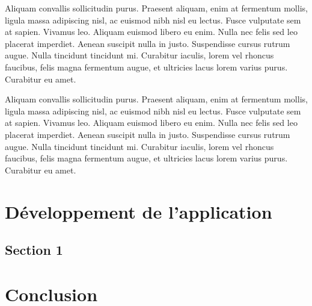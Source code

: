 \documentclass[twoside]{report}
\newcommand{\clearemptydoublepage}{\newpage{\pagestyle{empty}
\cleardoublepage}}
\begin{document}
Aliquam convallis sollicitudin purus. Praesent aliquam, enim at fermentum mollis, ligula massa adipiscing nisl, ac euismod nibh nisl eu lectus. Fusce vulputate sem at sapien. Vivamus leo. Aliquam euismod libero eu enim. Nulla nec felis sed leo placerat imperdiet. Aenean suscipit nulla in justo. Suspendisse cursus rutrum augue. Nulla tincidunt tincidunt mi. Curabitur iaculis, lorem vel rhoncus faucibus, felis magna fermentum augue, et ultricies lacus lorem varius purus. Curabitur eu amet.

Aliquam convallis sollicitudin purus. Praesent aliquam, enim at fermentum mollis, ligula massa adipiscing nisl, ac euismod nibh nisl eu lectus. Fusce vulputate sem at sapien. Vivamus leo. Aliquam euismod libero eu enim. Nulla nec felis sed leo placerat imperdiet. Aenean suscipit nulla in justo. Suspendisse cursus rutrum augue. Nulla tincidunt tincidunt mi. Curabitur iaculis, lorem vel rhoncus faucibus, felis magna fermentum augue, et ultricies lacus lorem varius purus. Curabitur eu amet.

\clearemptydoublepage
\chapter{Développement de l'application}
\section{Section 1}

\clearemptydoublepage
\chapter*{Conclusion}

\clearemptydoublepage
\printbibliography[
heading=bibintoc, %
]

\clearemptydoublepage
\listoffigures

\clearemptydoublepage
\listoftables

\clearemptydoublepage
\end{document}
